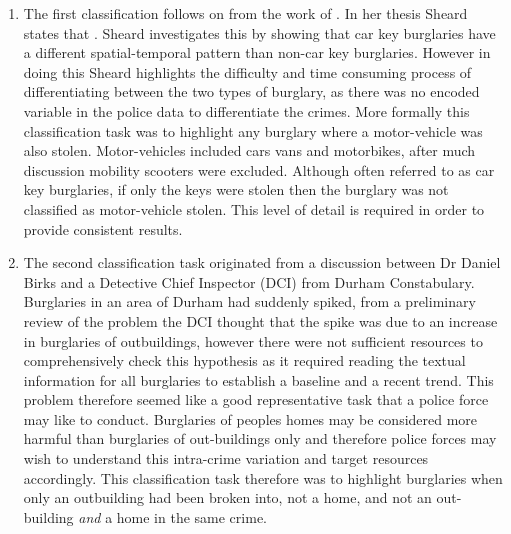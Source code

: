 \begin{enumerate}
   
\item The first classification follows on from the work of \parencite{sheard2020developing}. In her thesis Sheard states that . Sheard investigates this by showing that car key burglaries have a different spatial-temporal pattern than non-car key burglaries. However in doing this Sheard highlights the difficulty and time consuming process of differentiating between the two types of burglary, as there was no encoded variable in the police data to differentiate the crimes. More formally this classification task was to highlight any burglary where a motor-vehicle was also stolen. Motor-vehicles included cars vans and motorbikes, after much discussion mobility scooters were excluded. Although often referred to as car key burglaries, if only the keys were stolen then the burglary was not classified as motor-vehicle stolen. This level of detail is required in order to provide consistent results. 

 \item The second classification task originated from a discussion between Dr Daniel Birks and a Detective Chief Inspector (DCI) from Durham Constabulary. Burglaries in an area of Durham had suddenly spiked, from a preliminary review of the problem the DCI thought that the spike was due to an increase in burglaries of outbuildings, however there were not sufficient resources to comprehensively check this hypothesis as it required reading the textual information for all burglaries to establish a baseline and a recent trend. This problem therefore seemed like a good representative task that a police force may like to conduct. Burglaries of peoples homes may be considered more harmful than burglaries of out-buildings only and therefore police forces may wish to understand this intra-crime variation and target resources accordingly.  This classification task therefore was to highlight burglaries when only an outbuilding had been broken into, not a home, and not an out-building \emph{and} a home in the same crime.  



\end{enumerate}
